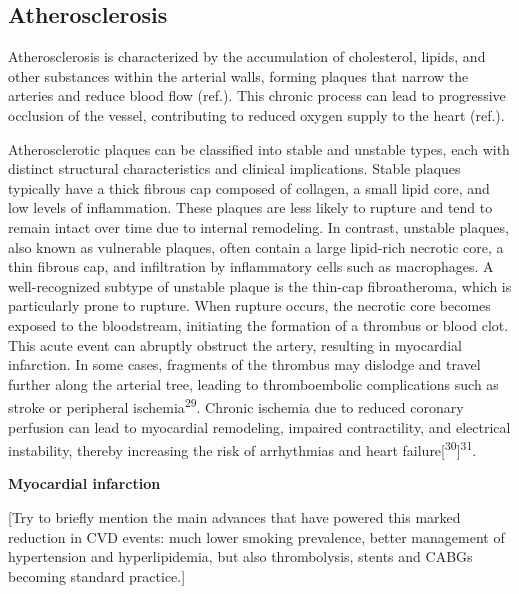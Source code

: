 \documentclass[
  a4paper,
  headsepline=true,
  open=any]{scrbook}
\begin{document}
\hypertarget{atherosclerosis}{%
\subsection{Atherosclerosis}\label{atherosclerosis}}

Atherosclerosis is characterized by the accumulation of cholesterol,
lipids, and other substances within the arterial walls, forming plaques
that narrow the arteries and reduce blood flow (ref.). This chronic
process can lead to progressive occlusion of the vessel, contributing to
reduced oxygen supply to the heart (ref.).

Atherosclerotic plaques can be classified into stable and unstable
types, each with distinct structural characteristics and clinical
implications. Stable plaques typically have a thick fibrous cap composed
of collagen, a small lipid core, and low levels of inflammation. These
plaques are less likely to rupture and tend to remain intact over time
due to internal remodeling. In contrast, unstable plaques, also known as
vulnerable plaques, often contain a large lipid-rich necrotic core, a
thin fibrous cap, and infiltration by inflammatory cells such as
macrophages. A well-recognized subtype of unstable plaque is the
thin-cap fibroatheroma, which is particularly prone to rupture. When
rupture occurs, the necrotic core becomes exposed to the bloodstream,
initiating the formation of a thrombus or blood clot. This acute event
can abruptly obstruct the artery, resulting in myocardial infarction. In
some cases, fragments of the thrombus may dislodge and travel further
along the arterial tree, leading to thromboembolic complications such as
stroke or peripheral ischemia\textsuperscript{29}. Chronic ischemia due
to reduced coronary perfusion can lead to myocardial remodeling,
impaired contractility, and electrical instability, thereby increasing
the risk of arrhythmias and heart
failure{[}\textsuperscript{30}{]}\textsuperscript{31}.

\textbf{Myocardial infarction}

{[}Try to briefly mention the main advances that have powered this
marked reduction in CVD events: much lower smoking prevalence, better
management of hypertension and hyperlipidemia, but also thrombolysis,
stents and CABGs becoming standard practice.{]}
\end{document}
